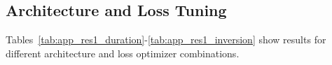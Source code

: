 
\subsection{Architecture and Loss Tuning}
Tables~\ref{tab:app_res1_duration}-\ref{tab:app_res1_inversion} show results for different architecture and loss optimizer combinations.
